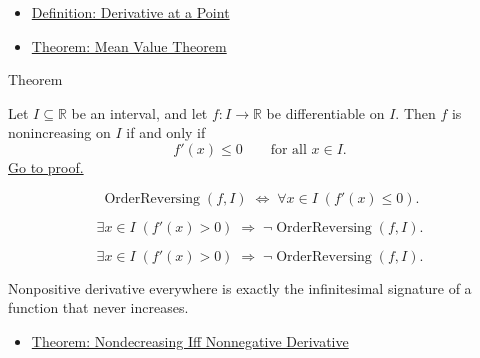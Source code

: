 \begin{dependencies}
\begin{itemize}
  \item \hyperref[def:derivative-at-a-point]{Definition: Derivative at a Point}
  \item \hyperref[thm:mean-value-theorem]{Theorem: Mean Value Theorem}
\end{itemize}
\end{dependencies}


\begin{theorembox}{Theorem}
\begin{theorem}
\label{thm:nonincreasing-iff-nonpos-derivative}
Let $I \subseteq \mathbb{R}$ be an interval, and let $f : I \to \mathbb{R}$ be differentiable on $I$. Then $f$ is nonincreasing on $I$ if and only if
\[
f'(x) \leq 0 \qquad \text{for all } x \in I.
\]
\hyperref[prf:nonincreasing-iff-nonpos-derivative]{Go to proof.}
\end{theorem}
\end{theorembox}

\begin{remark*}
\[
\operatorname{OrderReversing}(f,I)
\;\iff\;
\forall x \in I\;(f'(x) \leq 0).
\]
\end{remark*}

\begin{remark*}[Interpretation]
\[
\exists x \in I\;(f'(x) > 0) \;\Rightarrow\; \lnot\operatorname{OrderReversing}(f,I).
\]


\[
\exists x \in I\;(f'(x) > 0) \;\Rightarrow\; \lnot\operatorname{OrderReversing}(f,I).
\]


Nonpositive derivative everywhere is exactly the infinitesimal signature of a function that never increases.
\end{remark*}

\begin{dependencies}
\begin{itemize}
  \item \hyperref[thm:nondecreasing-iff-nonneg-derivative]{Theorem: Nondecreasing Iff Nonnegative Derivative}
\end{itemize}
\end{dependencies}

